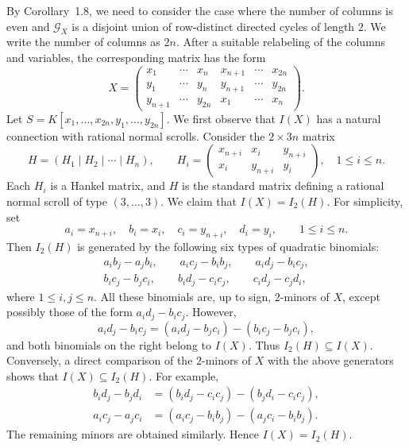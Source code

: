 \documentclass[12pt]{amsart}
\numberwithin{equation}{section}
\begin{document}
By Corollary~1.8, we need to consider the case where the number
of columns is even and $\mathcal G_X$ is a disjoint union of row-distinct
directed cycles of length $2$. We write the number of columns
as $2n$. After a suitable relabeling of the columns and
variables, the corresponding matrix has the form
\begin{equation}\label{matrixX}
    X=
\begin{pmatrix}
x_1 & \cdots & x_n & x_{n+1} & \cdots & x_{2n}\\
y_1 & \cdots & y_n & y_{n+1} & \cdots & y_{2n}\\
y_{n+1} & \cdots & y_{2n} & x_1 & \cdots & x_n
\end{pmatrix}.
\end{equation}
Let $S=K[x_1,\ldots,x_{2n},y_1,\ldots,y_{2n}]$. We first observe that $I(X)$ has a natural connection with
rational normal scrolls. Consider the $2\times 3n$ matrix
\[
H=(H_1\mid H_2\mid\cdots\mid H_n),
\qquad
H_i=
\begin{pmatrix}
x_{n+i} & x_i & y_{n+i}\\
x_i & y_{n+i} & y_i
\end{pmatrix},
\quad 1\leq i\leq n.
\]
Each $H_i$ is a Hankel matrix, and $H$ is the standard
matrix defining a rational normal scroll of type
$(3,\ldots,3)$. We claim that $I(X)=I_2(H).$ For simplicity, set
\[
a_i=x_{n+i},\quad b_i=x_i,\quad
c_i=y_{n+i},\quad d_i=y_i,
\qquad 1\leq i\leq n.
\]
Then $I_2(H)$ is generated by the following six types
of quadratic binomials:
\[
\begin{gathered}
a_i b_j-a_j b_i,\qquad
a_i c_j-b_i b_j,\qquad
a_i d_j-b_i c_j,\\
b_i c_j-b_j c_i,\qquad
b_i d_j-c_i c_j,\qquad
c_i d_j-c_j d_i,
\end{gathered}
\]
where $1\leq i,j\leq n$. All these binomials are, up to sign, $2$-minors of $X$,
except possibly those of the form $a_i d_j-b_i c_j$.
However,
\[
a_i d_j-b_i c_j
=(a_i d_j-b_j c_i)-(b_i c_j-b_j c_i),
\]
and both binomials on the right belong to $I(X)$.
Thus $I_2(H)\subseteq I(X)$. Conversely, a direct comparison of the $2$-minors
of $X$ with the above generators shows that
$I(X)\subseteq I_2(H)$. For example,
\[
\begin{aligned}
b_i d_j-b_j d_i
&=(b_i d_j-c_i c_j)-(b_j d_i-c_i c_j),\\
a_i c_j-a_j c_i
&=(a_i c_j-b_i b_j)-(a_j c_i-b_i b_j).
\end{aligned}
\]
The remaining minors are obtained similarly.
Hence $I(X)=I_2(H)$.
\end{document}
